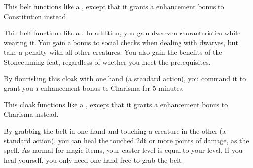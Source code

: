 
 This belt functions like a , except that it grants a  enhancement bonus to Constitution instead.


 This belt functions like a . In addition, you gain dwarven characteristics while wearing it. You gain a  bonus to social checks when dealing with dwarves, but take a  penalty with all other creatures. You also gain the benefits of the Stonecunning feat, regardless of whether you meet the prerequisites.


 By flourishing this cloak with one hand (a standard action), you command it to grant you a  enhancement bonus to Charisma for 5 minutes.


 This cloak functions like a , except that it grants a  enhancement bonus to Charisma instead.


 By grabbing the belt in one hand and touching a creature in the other (a standard action), you can heal the touched 2d6 or more points of damage, as the  spell. As normal for magic items, your caster level is equal to your level. If you heal yourself, you only need one hand free to grab the belt.


